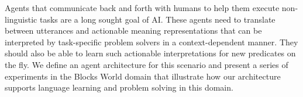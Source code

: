 Agents that communicate back and forth with humans to help them execute non-linguistic tasks are a long sought goal of AI. These agents need to translate between utterances and actionable meaning representations that can be interpreted by task-specific problem solvers in a context-dependent manner. They should also be able to learn such actionable interpretations for new predicates on the fly. We define an agent architecture for this scenario and present a series of experiments in the Blocks World domain that illustrate how our architecture supports language learning and problem solving in this domain.
